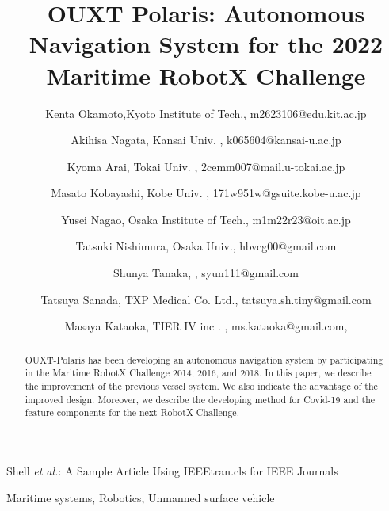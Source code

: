 \documentclass[lettersize,journal]{IEEEtran}
\begin{document}
\title{OUXT Polaris: Autonomous Navigation System for the 2022 Maritime RobotX Challenge}
\author{
    Kenta Okamoto,Kyoto Institute of Tech., m2623106@edu.kit.ac.jp \\ \and
    Akihisa Nagata, Kansai Univ. , k065604@kansai-u.ac.jp \\ \and
    Kyoma Arai, Tokai Univ. , 2cemm007@mail.u-tokai.ac.jp \\ \and
    Masato Kobayashi, Kobe Univ. , 171w951w@gsuite.kobe-u.ac.jp \\ \and
    Yusei Nagao, Osaka Institute of Tech., m1m22r23@oit.ac.jp \\ \and
    Tatsuki Nishimura, Osaka Univ., hbvcg00@gmail.com \\ \and
    Shunya Tanaka, , syun111@gmail.com \\ \and
    Tatsuya Sanada, TXP Medical Co. Ltd., tatsuya.sh.tiny@gmail.com \\ \and
    Masaya Kataoka, TIER IV inc . , ms.kataoka@gmail.com,
}

%
{Shell \MakeLowercase{\textit{et al.}}: A Sample Article Using IEEEtran.cls for IEEE Journals}


\maketitle

\begin{abstract}
OUXT-Polaris has been developing an autonomous navigation system by participating in the 
Maritime RobotX Challenge 2014, 2016, and 2018. 
In this paper, we describe the improvement of the previous vessel system. 
We also indicate the advantage of the improved design.
Moreover, we describe the developing method for Covid-19 and the 
feature components for the next RobotX Challenge.
\end{abstract}

\begin{IEEEkeywords}
Maritime systems, Robotics, Unmanned surface vehicle
\end{IEEEkeywords}
\end{document}
